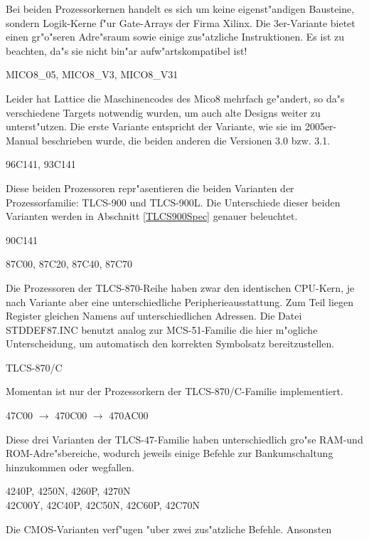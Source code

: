 \documentclass[12pt,a4paper,twoside]{report}
\begin{document}
Bei beiden Prozessorkernen handelt es sich um keine eigenst"andigen
Bausteine, sondern Logik-Kerne f"ur Gate-Arrays der Firma Xilinx.  Die
3er-Variante bietet einen gr"o"seren Adre"sraum sowie einige zus"atzliche
Instruktionen.  Es ist zu beachten, da"s sie nicht bin"ar
aufw"artskompatibel ist!
\begin{cpulist}
   MICO8\_05, MICO8\_V3, MICO8\_V31
\end{cpulist}
Leider hat Lattice die Maschinencodes des Mico8 mehrfach ge"andert, so
da"s verschiedene Targets notwendig wurden, um auch alte Designs weiter
zu unterst"utzen.  Die erste Variante entspricht der Variante, wie sie
im 2005er-Manual beschrieben wurde, die beiden anderen die Versionen 3.0
bzw. 3.1.
\begin{cpulist}
   96C141, 93C141
\end{cpulist}
Diese beiden Prozessoren repr"asentieren die beiden Varianten der
Prozessorfamilie: TLCS-900 und TLCS-900L.  Die Unterschiede dieser beiden
Varianten werden in Abschnitt \ref{TLCS900Spec} genauer beleuchtet.
\begin{cpulist}
   90C141
\end{cpulist}
\begin{cpulist}
   87C00, 87C20, 87C40, 87C70
\end{cpulist}
Die Prozessoren der TLCS-870-Reihe haben zwar den identischen CPU-Kern, je
nach Variante aber eine unterschiedliche Peripherieausstattung.  Zum
Teil liegen Register gleichen Namens auf unterschiedlichen Adressen.
Die Datei STDDEF87.INC benutzt analog zur MCS-51-Familie die hier
m"ogliche Unterscheidung, um automatisch den korrekten Symbolsatz
bereitzustellen.
\begin{cpulist}
   TLCS-870/C
\end{cpulist}
Momentan ist nur der Prozessorkern der TLCS-870/C-Familie implementiert.
\begin{cpulist}
   47C00 $\rightarrow$ 470C00 $\rightarrow$ 470AC00
\end{cpulist}
Diese drei Varianten der TLCS-47-Familie haben unterschiedlich gro"se
RAM-und ROM-Adre"sbereiche, wodurch jeweils einige Befehle zur
Bankumschaltung hinzukommen oder wegfallen.
\begin{cpulist}
4240P, 4250N, 4260P, 4270N \\
42C00Y, 42C40P, 42C50N, 42C60P, 42C70N\\
\end{cpulist}
Die CMOS-Varianten verf"ugen "uber zwei zus"atzliche Befehle.  Ansonsten
\end{document}
